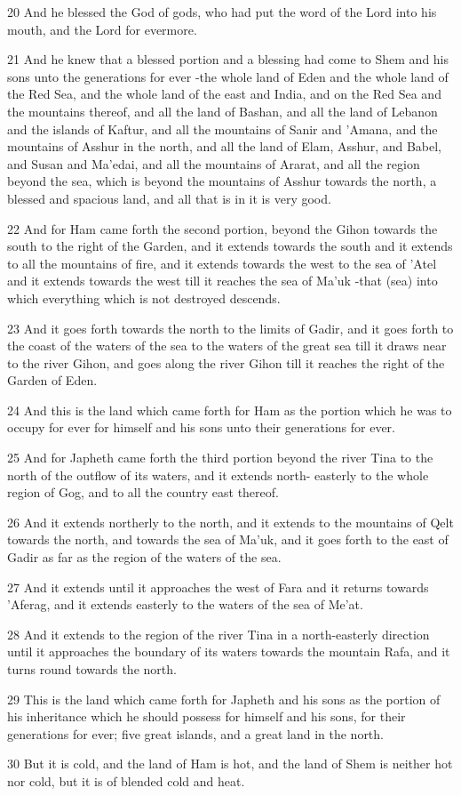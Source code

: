 \par 20 And he blessed the God of gods, who had put the word of the Lord into his mouth, and the Lord for evermore.
\par 21 And he knew that a blessed portion and a blessing had come to Shem and his sons unto the generations for ever -the whole land of Eden and the whole land of the Red Sea, and the whole land of the east and India, and on the Red Sea and the mountains thereof, and all the land of Bashan, and all the land of Lebanon and the islands of Kaftur, and all the mountains of Sanir and 'Amana, and the mountains of Asshur in the north, and all the land of Elam, Asshur, and Babel, and Susan and Ma'edai, and all the mountains of Ararat, and all the region beyond the sea, which is beyond the mountains of Asshur towards the north, a blessed and spacious land, and all that is in it is very good.
\par 22 And for Ham came forth the second portion, beyond the Gihon towards the south to the right of the Garden, and it extends towards the south and it extends to all the mountains of fire, and it extends towards the west to the sea of 'Atel and it extends towards the west till it reaches the sea of Ma'uk -that (sea) into which everything which is not destroyed descends.
\par 23 And it goes forth towards the north to the limits of Gadir, and it goes forth to the coast of the waters of the sea to the waters of the great sea till it draws near to the river Gihon, and goes along the river Gihon till it reaches the right of the Garden of Eden.
\par 24 And this is the land which came forth for Ham as the portion which he was to occupy for ever for himself and his sons unto their generations for ever.
\par 25 And for Japheth came forth the third portion beyond the river Tina to the north of the outflow of its waters, and it extends north- easterly to the whole region of Gog, and to all the country east thereof.
\par 26 And it extends northerly to the north, and it extends to the mountains of Qelt towards the north, and towards the sea of Ma'uk, and it goes forth to the east of Gadir as far as the region of the waters of the sea.
\par 27 And it extends until it approaches the west of Fara and it returns towards 'Aferag, and it extends easterly to the waters of the sea of Me'at.
\par 28 And it extends to the region of the river Tina in a north-easterly direction until it approaches the boundary of its waters towards the mountain Rafa, and it turns round towards the north.
\par 29 This is the land which came forth for Japheth and his sons as the portion of his inheritance which he should possess for himself and his sons, for their generations for ever; five great islands, and a great land in the north.
\par 30 But it is cold, and the land of Ham is hot, and the land of Shem is neither hot nor cold, but it is of blended cold and heat.


